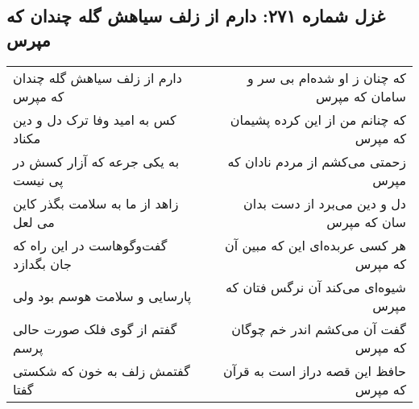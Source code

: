 \begin{center}
\section*{غزل شماره ۲۷۱: دارم از زلف سیاهش گله چندان که مپرس}
\label{sec:sh271}
\begin{longtable}{l p{0.5cm} r}
دارم از زلف سیاهش گله چندان که مپرس
&&
که چنان ز او شده‌ام بی سر و سامان که مپرس
\\
کس به امید وفا ترک دل و دین مکناد
&&
که چنانم من از این کرده پشیمان که مپرس
\\
به یکی جرعه که آزار کسش در پی نیست
&&
زحمتی می‌کشم از مردم نادان که مپرس
\\
زاهد از ما به سلامت بگذر کاین می لعل
&&
دل و دین می‌برد از دست بدان سان که مپرس
\\
گفت‌وگوهاست در این راه که جان بگدازد
&&
هر کسی عربده‌ای این که مبین آن که مپرس
\\
پارسایی و سلامت هوسم بود ولی
&&
شیوه‌ای می‌کند آن نرگس فتان که مپرس
\\
گفتم از گوی فلک صورت حالی پرسم
&&
گفت آن می‌کشم اندر خم چوگان که مپرس
\\
گفتمش زلف به خون که شکستی گفتا
&&
حافظ این قصه دراز است به قرآن که مپرس
\\
\end{longtable}
\end{center}
